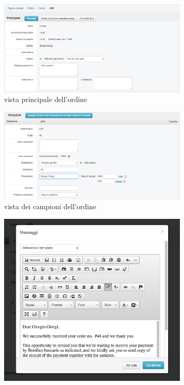 \begin{figure}
 \centering
 \begin{subfigure}[b]{0.75\textwidth}
   \includegraphics[width=\textwidth]{images/admin-ordine-p} 
   \caption{vista principale dell'ordine}
 \end{subfigure}
 \begin{subfigure}[b]{0.75\textwidth}
   \includegraphics[width=\textwidth]{images/admin-ordine-c}
   \caption{vista dei campioni dell'ordine}
 \end{subfigure}
 \begin{subfigure}[b]{0.4\textwidth}
   \includegraphics[width=\textwidth]{images/admin-ordine-mess} 

\end{subfigure}
\end{figure}
